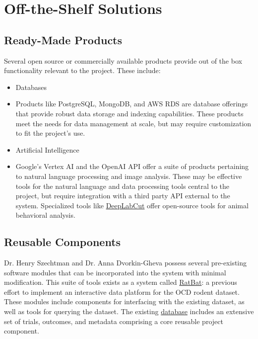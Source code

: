 \documentclass[12pt]{article}
\begin{document}
\section{Off-the-Shelf Solutions}
\subsection{Ready-Made Products}

Several open source or commercially available products provide out of the box functionality relevant to the project. These include: 

\begin{itemize}
    \item Databases 
    \item[] Products like PostgreSQL, MongoDB, and AWS RDS are database offerings that provide robust data storage and indexing capabilities. These products meet the needs for data management at scale, but may require customization to fit the project's use. 
    \item Artificial Intelligence 
    \item[] Google's Vertex AI and the OpenAI API offer a suite of products pertaining to natural language processing and image analysis. These may be effective tools for the natural language and data processing tools central to the project, but require integration with a third party API external to the system. Specialized tools like \href{https://github.com/DeepLabCut/DeepLabCut}{DeepLabCut} offer open-source tools for animal behavioral analysis. 

\end{itemize}



\subsection{Reusable Components}

Dr. Henry Szechtman and Dr. Anna Dvorkin-Gheva possess several pre-existing software modules that can be incorporated into the system with minimal modification. This suite of tools exists as a system called \href{https://github.com/brandonc-edu/RatBAT/tree/main}{RatBat}: a previous effort to implement an interactive data platform for the OCD rodent dataset. These modules include components for interfacing with the existing dataset, as well as tools for querying the dataset. The existing \href{https://doi.org/10.1093/gigascience/giac092}{database} includes an extensive set of trials, outcomes, and metadata comprising a core reusable project component.
\end{document}
